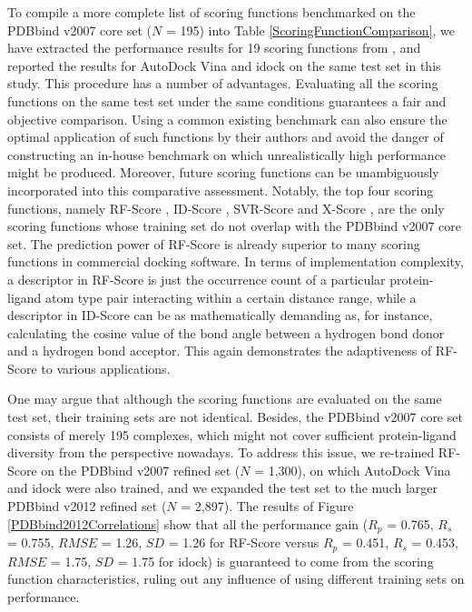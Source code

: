 \documentclass[10pt]{article}
\begin{document}
To compile a more complete list of scoring functions benchmarked on the PDBbind v2007 core set ($N$ = 195) into Table \ref{ScoringFunctionComparison}, we have extracted the performance results for 19 scoring functions from \cite{1313,564,1305,1295}, and reported the results for AutoDock Vina and idock on the same test set in this study. This procedure has a number of advantages. Evaluating all the scoring functions on the same test set under the same conditions guarantees a fair and objective comparison. Using a common existing benchmark can also ensure the optimal application of such functions by their authors and avoid the danger of constructing an in-house benchmark on which unrealistically high performance might be produced. Moreover, future scoring functions can be unambiguously incorporated into this comparative assessment. Notably, the top four scoring functions, namely RF-Score \cite{564}, ID-Score \cite{1305}, SVR-Score \cite{1295} and X-Score \cite{573}, are the only scoring functions whose training set do not overlap with the PDBbind v2007 core set. The prediction power of RF-Score is already superior to many scoring functions in commercial docking software. In terms of implementation complexity, a descriptor in RF-Score is just the occurrence count of a particular protein-ligand atom type pair interacting within a certain distance range, while a descriptor in ID-Score can be as mathematically demanding as, for instance, calculating the cosine value of the bond angle between a hydrogen bond donor and a hydrogen bond acceptor. This again demonstrates the adaptiveness of RF-Score to various applications.

One may argue that although the scoring functions are evaluated on the same test set, their training sets are not identical. Besides, the PDBbind v2007 core set consists of merely 195 complexes, which might not cover sufficient protein-ligand diversity from the perspective nowadays. To address this issue, we re-trained RF-Score on the PDBbind v2007 refined set ($N$ = 1,300), on which AutoDock Vina and idock were also trained, and we expanded the test set to the much larger PDBbind v2012 refined set ($N$ = 2,897). The results of Figure \ref{PDBbind2012Correlations} show that all the performance gain ($R_p$ = 0.765, $R_s$ = 0.755, $RMSE$ = 1.26, $SD$ = 1.26 for RF-Score versus $R_p$ = 0.451, $R_s$ = 0.453, $RMSE$ = 1.75, $SD$ = 1.75 for idock) is guaranteed to come from the scoring function characteristics, ruling out any influence of using different training sets on performance.
\end{document}

